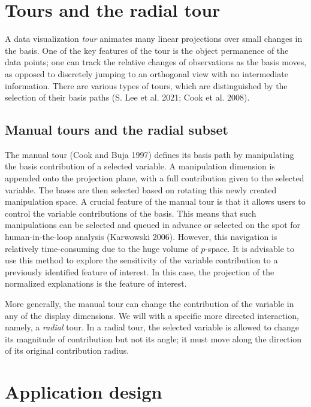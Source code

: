 \documentclass[
  article]{article}
\begin{document}
\hypertarget{tours-and-the-radial-tour}{%
\section{Tours and the radial tour}\label{tours-and-the-radial-tour}}

A data visualization \emph{tour} animates many linear projections over small changes in the basis. One of the key features of the tour is the object permanence of the data points; one can track the relative changes of observations as the basis moves, as opposed to discretely jumping to an orthogonal view with no intermediate information. There are various types of tours, which are distinguished by the selection of their basis paths (S. Lee et al. 2021; Cook et al. 2008).

\hypertarget{manual-tours-and-the-radial-subset}{%
\subsection{Manual tours and the radial subset}\label{manual-tours-and-the-radial-subset}}

The manual tour (Cook and Buja 1997) defines its basis path by manipulating the basis contribution of a selected variable. A manipulation dimension is appended onto the projection plane, with a full contribution given to the selected variable. The bases are then selected based on rotating this newly created manipulation space. A crucial feature of the manual tour is that it allows users to control the variable contributions of the basis. This means that such manipulations can be selected and queued in advance or selected on the spot for human-in-the-loop analysis (Karwowski 2006). However, this navigation is relatively time-consuming due to the huge volume of \(p\)-space. It is advisable to use this method to explore the sensitivity of the variable contribution to a previously identified feature of interest. In this case, the projection of the normalized explanations is the feature of interest.

More generally, the manual tour can change the contribution of the variable in any of the display dimensions. We will with a specific more directed interaction, namely, a \emph{radial} tour. In a radial tour, the selected variable is allowed to change its magnitude of contribution but not its angle; it must move along the direction of its original contribution radius.

\hypertarget{sec:applicationdesign}{%
\section{Application design}\label{sec:applicationdesign}}
\end{document}
